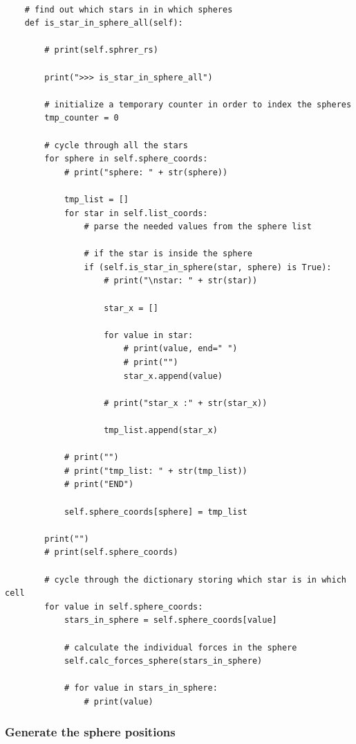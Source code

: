\begin{lstlisting}

    # find out which stars in in which spheres
    def is_star_in_sphere_all(self):

        # print(self.sphrer_rs)

        print(">>> is_star_in_sphere_all")

        # initialize a temporary counter in order to index the spheres
        tmp_counter = 0

        # cycle through all the stars
        for sphere in self.sphere_coords:
            # print("sphere: " + str(sphere))

            tmp_list = []
            for star in self.list_coords:
                # parse the needed values from the sphere list

                # if the star is inside the sphere
                if (self.is_star_in_sphere(star, sphere) is True):
                    # print("\nstar: " + str(star))

                    star_x = []

                    for value in star:
                        # print(value, end=" ")
                        # print("")
                        star_x.append(value)

                    # print("star_x :" + str(star_x))

                    tmp_list.append(star_x)

            # print("")
            # print("tmp_list: " + str(tmp_list))
            # print("END")

            self.sphere_coords[sphere] = tmp_list

        print("")
        # print(self.sphere_coords)

        # cycle through the dictionary storing which star is in which cell
        for value in self.sphere_coords:
            stars_in_sphere = self.sphere_coords[value]

            # calculate the individual forces in the sphere
            self.calc_forces_sphere(stars_in_sphere)

            # for value in stars_in_sphere:
                # print(value)

\end{lstlisting}

\subsubsection{Generate the sphere positions}

